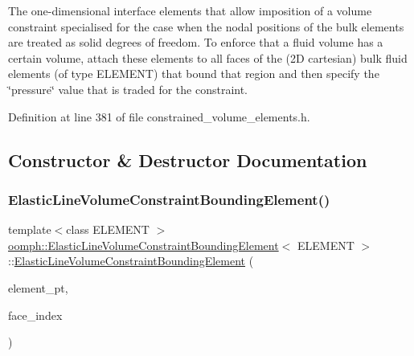 The one-\/dimensional interface elements that allow imposition of a volume constraint specialised for the case when the nodal positions of the bulk elements are treated as solid degrees of freedom. To enforce that a fluid volume has a certain volume, attach these elements to all faces of the (2D cartesian) bulk fluid elements (of type E\+L\+E\+M\+E\+NT) that bound that region and then specify the \char`\"{}pressure\char`\"{} value that is traded for the constraint. 

Definition at line 381 of file constrained\+\_\+volume\+\_\+elements.\+h.



\subsection{Constructor \& Destructor Documentation}
\mbox{\label{classoomph_1_1ElasticLineVolumeConstraintBoundingElement_a4759433aaab9f854126480581e4f08d5}} 
\subsubsection{\texorpdfstring{Elastic\+Line\+Volume\+Constraint\+Bounding\+Element()}{ElasticLineVolumeConstraintBoundingElement()}}
{\footnotesize\ttfamily template$<$class E\+L\+E\+M\+E\+NT $>$ \\
\hyperlink{classoomph_1_1ElasticLineVolumeConstraintBoundingElement}{oomph\+::\+Elastic\+Line\+Volume\+Constraint\+Bounding\+Element}$<$ E\+L\+E\+M\+E\+NT $>$\+::\hyperlink{classoomph_1_1ElasticLineVolumeConstraintBoundingElement}{Elastic\+Line\+Volume\+Constraint\+Bounding\+Element} (\begin{DoxyParamCaption}\item[{\hyperlink{classoomph_1_1FiniteElement}{Finite\+Element} $\ast$const \&}]{element\+\_\+pt,  }\item[{const int \&}]{face\+\_\+index }\end{DoxyParamCaption})\hspace{0.3cm}{\ttfamily [inline]}}



